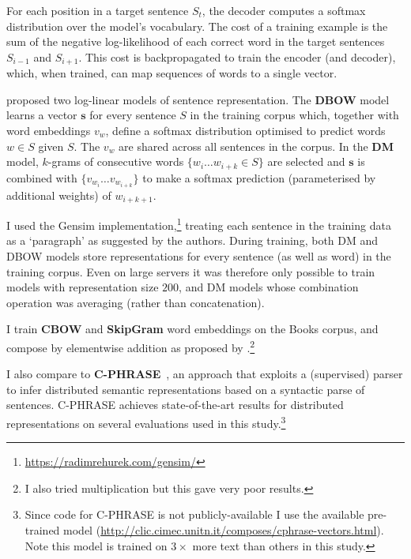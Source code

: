 For each position in a target sentence \(S_t\), the decoder computes a softmax distribution over the model's vocabulary. The cost of a training example is the sum of the negative log-likelihood of each correct word in the target sentences \(S_{i-1}\) and \(S_{i+1}\). This cost is backpropagated to train the encoder (and decoder), which, when trained, can map sequences of words to a single vector.

\vspace{5pt} \cite{le2014distributed} proposed two log-linear models of sentence representation. The {\bf DBOW} model learns a vector \(\mathbf{s}\) for every sentence \(S\) in the training corpus which, together with word embeddings \(v_w\), define a softmax distribution optimised to predict words \(w \in S\) given \(S\). The \(v_w\) are shared across all sentences in the corpus. In the {\bf DM} model, \(k\)-grams of consecutive words \(\{w_i \dots w_{i+k} \in S\}\) are selected and \(\mathbf{s}\) is combined with \(\{v_{w_i} \dots v_{w_{i+k}} \}\) to make a softmax prediction (parameterised by additional weights) of \(w_{i+k+1}\). 

I used the Gensim implementation,\footnote{\scriptsize \url{https://radimrehurek.com/gensim/}} treating each sentence in the training data as a `paragraph' as suggested by the authors. During training, both DM and DBOW models store representations for every sentence (as well as word) in the training corpus. Even on large servers it was therefore only possible to train models with representation size \(200\), and DM models whose combination operation was averaging (rather than concatenation). 

\vspace{5pt} I train {\bf CBOW} and {\bf SkipGram} word embeddings \citep{mikolov2013distributed} on the Books corpus, and compose by elementwise addition as proposed by \cite{mitchell2010composition}.\footnote{I also tried multiplication but this gave very poor results.} 

I also compare to {\bf C-PHRASE}~\citep{marcobaronijointly}, an approach that exploits a (supervised) parser to infer distributed semantic representations based on a syntactic parse of sentences. C-PHRASE achieves state-of-the-art results for distributed representations on several evaluations used in this study.\footnote{Since code for C-PHRASE is not publicly-available I use the available pre-trained model ({\scriptsize \url{http://clic.cimec.unitn.it/composes/cphrase-vectors.html}}). Note this model is trained on \(3\times\) more text than others in this study.}

